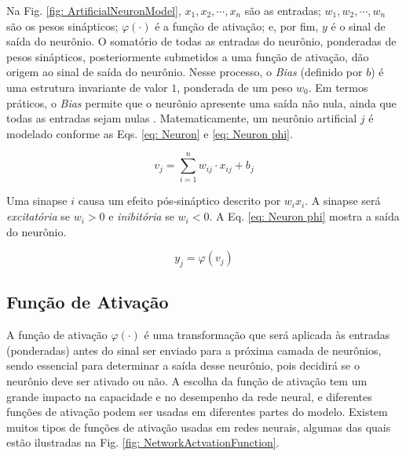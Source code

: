 Na Fig. \ref{fig: ArtificialNeuronModel}, $x_{1}, x_{2}, \cdots, x_{n}$ são as entradas; $w_{1}, w_{2}, \cdots, w_{n}$ são os pesos sinápticos; $\varphi(\cdot)$ é a função de ativação; e, por fim, $y$ é o sinal de saída do neurônio. O somatório de todas as entradas do neurônio, ponderadas de pesos sinápticos, posteriormente submetidos a uma função de ativação, dão origem ao sinal de saída do neurônio. Nesse processo, o \textit{Bias} (definido por $b$) é uma estrutura invariante de valor $1$, ponderada de um peso $w_{0}$. Em termos práticos, o \textit{Bias} permite que o neurônio apresente uma saída não nula, ainda que todas as entradas sejam nulas \cite{haykin2007redes,aggarwal2018neural}. Matematicamente, um neurônio artificial $j$ é modelado conforme as Eqs. \ref{eq: Neuron} e \ref{eq: Neuron phi}.

\begin{equation}    \label{eq: Neuron}
    v_{j} = \sum_{i=1}^{n}w_{ij}\cdot x_{ij} + b_{j}
\end{equation}

Uma sinapse $i$ causa um efeito pós-sináptico descrito por $w_{i}x_{i}$. A sinapse será \textit{excitatória} se $w_{i} > 0$ e \textit{inibitória} se $w_{i} < 0$. A Eq. \ref{eq: Neuron phi} mostra a saída do neurônio.

\begin{equation}    \label{eq: Neuron phi}
    y_{j} = \varphi(v_{j})
\end{equation}


\subsection{Função de Ativação}

A função de ativação $\varphi(\cdot)$ é uma transformação que será aplicada às entradas (ponderadas) antes do sinal ser enviado para a próxima camada de neurônios, sendo essencial para determinar a saída desse neurônio, pois decidirá se o neurônio deve ser ativado ou não. A escolha da função de ativação tem um grande impacto na capacidade e no desempenho da rede neural, e diferentes funções de ativação podem ser usadas em diferentes partes do modelo. Existem muitos tipos de funções de ativação usadas em redes neurais, algumas das quais estão ilustradas na Fig. \ref{fig: NetworkActvationFunction}.

